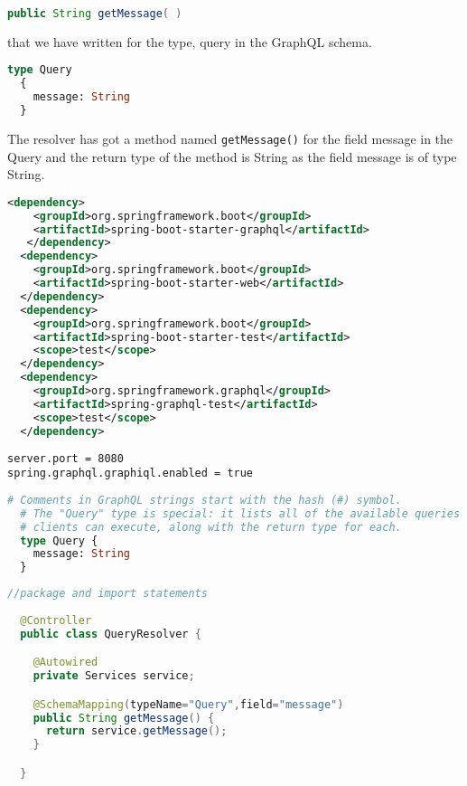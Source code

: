 \documentclass[../main.tex]{subfiles}
\begin{document}
\begin{lstlisting}[language=java]
  public String getMessage( )
\end{lstlisting}

that we have written for the type, query in the GraphQL schema. 

\begin{lstlisting}[language=GraphQL]
  type Query
  {
    message: String
  }
\end{lstlisting}

The resolver has got a method named \lstinline{getMessage()} for the field message in the Query and the return type of the method is String as the field message is of type String.
\begin{lstlisting}[language=XML]
  <dependency>
    <groupId>org.springframework.boot</groupId>
    <artifactId>spring-boot-starter-graphql</artifactId>
   </dependency>
  <dependency>
    <groupId>org.springframework.boot</groupId>
    <artifactId>spring-boot-starter-web</artifactId>
  </dependency>
  <dependency>
    <groupId>org.springframework.boot</groupId>
    <artifactId>spring-boot-starter-test</artifactId>
    <scope>test</scope>
  </dependency>
  <dependency>
    <groupId>org.springframework.graphql</groupId>
    <artifactId>spring-graphql-test</artifactId>
    <scope>test</scope>
  </dependency>
\end{lstlisting}

\begin{lstlisting}[language=properties]
server.port = 8080
spring.graphql.graphiql.enabled = true
\end{lstlisting}

\begin{lstlisting}[language=GraphQL]
  # Comments in GraphQL strings start with the hash (#) symbol.
  # The "Query" type is special: it lists all of the available queries that
  # clients can execute, along with the return type for each. 
  type Query {
    message: String
  }
\end{lstlisting}

\begin{lstlisting}[language=java]
  //package and import statements
  
  @Controller
  public class QueryResolver {

    @Autowired
    private Services service;

    @SchemaMapping(typeName="Query",field="message")
    public String getMessage() {
      return service.getMessage();
    }

  }
\end{lstlisting}
\end{document}
